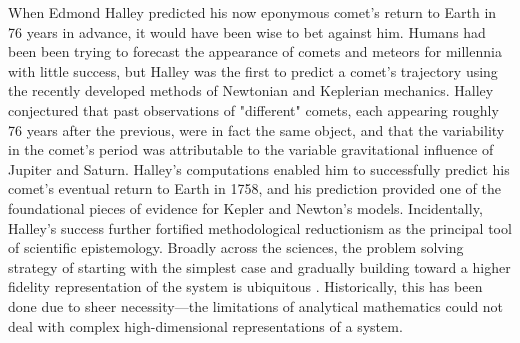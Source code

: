 \documentclass[]{article}
\begin{document}
When Edmond Halley predicted his now eponymous comet's return to Earth in 76 years in advance, it would have been wise to bet against him.
Humans had been been trying to forecast the appearance of comets and meteors for millennia with little success, but Halley was the first to predict a comet's trajectory using the recently developed methods of Newtonian and Keplerian mechanics.
Halley conjectured that past observations of "different" comets, each appearing roughly 76 years after the previous, were in fact the same object, and that the variability in the comet's period was attributable to the variable gravitational influence of Jupiter and Saturn.
Halley's computations enabled him to successfully predict his comet's eventual return to Earth in 1758, and his prediction provided one of the foundational pieces of evidence for Kepler and Newton's models.
Incidentally, Halley's success further fortified methodological reductionism as the principal tool of scientific epistemology.
Broadly across the sciences, the problem solving strategy of starting with the simplest case and gradually building toward a higher fidelity representation of the system is ubiquitous \cite{polya_how_2009}.
Historically, this has been done due to sheer necessity---the limitations of analytical mathematics could not deal with complex high-dimensional representations of a system.
\end{document}
